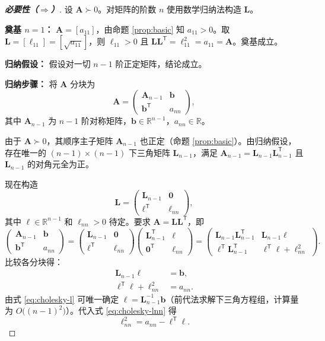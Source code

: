 \documentclass[12pt,a4paper]{article}
\theoremstyle{mystyle}
\theoremstyle{proofstyle}
\newtheorem*{proof}{证明}
\theoremstyle{definition}
\theoremstyle{remark}
\newcommand{\R}{\mathbb{R}}
\newcommand{\T}{^{\mathsf{T}}}
\newcommand{\A}{\mathbf{A}}
\newcommand{\Lmat}{\mathbf{L}}
\begin{document}
\begin{proof}[\textbf{必要性（$\Longrightarrow$）}]

设 $\A \succ 0$。对矩阵的阶数 $n$ 使用数学归纳法构造 $\Lmat$。

\textbf{奠基 $n=1$：} $\A = [a_{11}]$，由命题 \ref{prop:basic} 知 $a_{11} > 0$。取 $\Lmat = [\ell_{11}] = [\sqrt{a_{11}}]$，则 $\ell_{11} > 0$ 且 $\Lmat\Lmat\T = \ell_{11}^2 = a_{11} = \A$。奠基成立。

\textbf{归纳假设：} 假设对一切 $n-1$ 阶正定矩阵，结论成立。

\textbf{归纳步骤：} 将 $\A$ 分块为
\[
    \A = \begin{pmatrix}
        \A_{n-1} & \mathbf{b} \\[2pt]
        \mathbf{b}\T & a_{nn}
    \end{pmatrix},
\]
其中 $\A_{n-1}$ 为 $n-1$ 阶对称矩阵，$\mathbf{b} \in \R^{n-1}$，$a_{nn} \in \R$。

由于 $\A \succ 0$，其顺序主子矩阵 $\A_{n-1}$ 也正定（命题 \ref{prop:basic}）。由归纳假设，存在唯一的 $(n-1)\times (n-1)$ 下三角矩阵 $\Lmat_{n-1}$，满足 $\A_{n-1} = \Lmat_{n-1}\Lmat_{n-1}\T$ 且 $\Lmat_{n-1}$ 的对角元全为正。

现在构造
\[
    \Lmat = \begin{pmatrix}
        \Lmat_{n-1} & \mathbf{0} \\[2pt]
        \boldsymbol{\ell}\T & \ell_{nn}
    \end{pmatrix},
\]
其中 $\boldsymbol{\ell} \in \R^{n-1}$ 和 $\ell_{nn} > 0$ 待定。要求 $\A = \Lmat\Lmat\T$，即
\[
    \begin{pmatrix}
        \A_{n-1} & \mathbf{b} \\[2pt]
        \mathbf{b}\T & a_{nn}
    \end{pmatrix}
    =
    \begin{pmatrix}
        \Lmat_{n-1} & \mathbf{0} \\[2pt]
        \boldsymbol{\ell}\T & \ell_{nn}
    \end{pmatrix}
    \begin{pmatrix}
        \Lmat_{n-1}\T & \boldsymbol{\ell} \\[2pt]
        \mathbf{0}\T & \ell_{nn}
    \end{pmatrix}
    =
    \begin{pmatrix}
        \Lmat_{n-1}\Lmat_{n-1}\T & \Lmat_{n-1}\boldsymbol{\ell} \\[2pt]
        \boldsymbol{\ell}\T\Lmat_{n-1}\T & \boldsymbol{\ell}\T\boldsymbol{\ell} + \ell_{nn}^2
    \end{pmatrix}.
\]
比较各分块得：
\begin{align}
    \Lmat_{n-1}\boldsymbol{\ell} &= \mathbf{b}, \label{eq:cholesky-l} \\
    \boldsymbol{\ell}\T\boldsymbol{\ell} + \ell_{nn}^2 &= a_{nn}. \label{eq:cholesky-lnn}
\end{align}
由式 \eqref{eq:cholesky-l} 可唯一确定 $\boldsymbol{\ell} = \Lmat_{n-1}^{-1}\mathbf{b}$（前代法求解下三角方程组，计算量为 $O\big((n-1)^2\big)$）。代入式 \eqref{eq:cholesky-lnn} 得
\[
    \ell_{nn}^2 = a_{nn} - \boldsymbol{\ell}\T\boldsymbol{\ell}.
\]


\end{proof}
\end{document}
